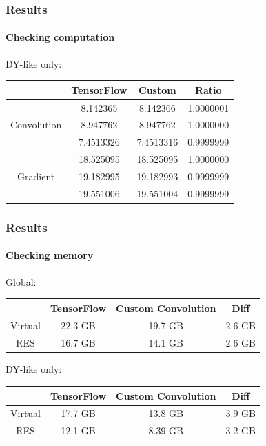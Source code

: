 \documentclass[aspectratio=43]{beamer}
\begin{document}
\begin{frame}

	\frametitle{Results}
	\framesubtitle{Checking computation}
	
	{\Large DY-like only:}
	\begin{table}
		\centering
		\begin{tabular}{c c c c}
			& TensorFlow & Custom & Ratio \\ \hline
			& 8.142365 & 8.142366 & {\color{darkgreen} 1.0000001} \\
			Convolution & 8.947762 & 8.947762 & {\color{darkgreen} 1.0000000} \\
			& 7.4513326 & 7.4513316 & {\color{darkgreen} 0.9999999} \\
			\hline
			& 18.525095 & 18.525095 & {\color{darkgreen} 1.0000000} \\
			Gradient & 19.182995 & 19.182993 & {\color{darkgreen} 0.9999999} \\
			& 19.551006 & 19.551004 & {\color{darkgreen} 0.9999999} \\
			\hline
		\end{tabular}
	\end{table}
	
	\end{frame}

\begin{frame}

	\frametitle{Results}
	\framesubtitle{Checking memory}
	
	{\Large Global:}
	\begin{table}
		\centering
		\begin{tabular}{c c c c}
			& TensorFlow & Custom Convolution & Diff \\ \hline
			Virtual & {\color{red} 22.3 GB} & {\color{darkgreen} 19.7 GB} & {\color{darkgreen} 2.6 GB} \\
			RES & {\color{red} 16.7 GB} & {\color{darkgreen} 14.1 GB} & {\color{darkgreen} 2.6 GB} \\ \hline
		\end{tabular}
	\end{table}
	
	\hfill
	
	{\Large DY-like only:}
	\begin{table}
	\centering
	\begin{tabular}{c c c c}
		& TensorFlow & Custom Convolution & Diff \\ \hline
		Virtual & {\color{red} 17.7 GB} & {\color{darkgreen} 13.8 GB} & {\color{darkgreen} 3.9 GB} \\
		RES & {\color{red} 12.1 GB} & {\color{darkgreen} 8.39 GB} & {\color{darkgreen} 3.2 GB} \\ \hline
	\end{tabular}
	\end{table}
	
\end{frame}
\end{document}

